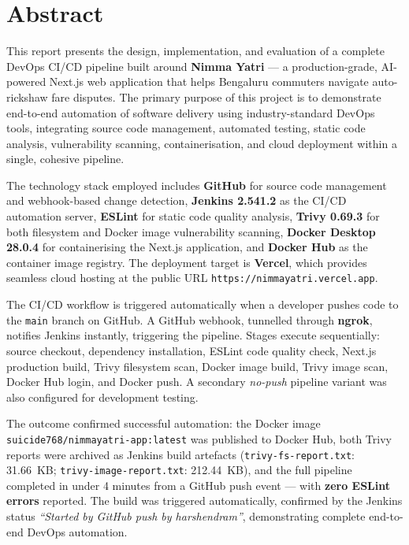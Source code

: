\documentclass[12pt,a4paper,oneside]{report}
\begin{document}
\clearpage
\setcounter{page}{1}

\pagestyle{plain}
\tableofcontents
\clearpage
\pagestyle{fancy}

\chapter{Abstract}

This report presents the design, implementation, and evaluation of a complete
DevOps CI/CD pipeline built around \textbf{Nimma Yatri} --- a production-grade,
AI-powered Next.js web application that helps Bengaluru commuters navigate
auto-rickshaw fare disputes. The primary purpose of this project is to demonstrate
end-to-end automation of software delivery using industry-standard DevOps tools,
integrating source code management, automated testing, static code analysis,
vulnerability scanning, containerisation, and cloud deployment within a single,
cohesive pipeline.

The technology stack employed includes \textbf{GitHub} for source code management
and webhook-based change detection, \textbf{Jenkins 2.541.2} as the CI/CD automation
server, \textbf{ESLint} for static code quality analysis,
\textbf{Trivy 0.69.3} for both filesystem and Docker image vulnerability scanning,
\textbf{Docker Desktop 28.0.4} for containerising the Next.js application, and
\textbf{Docker Hub} as the container image registry. The deployment target is
\textbf{Vercel}, which provides seamless cloud hosting at the public URL
\texttt{https://nimmayatri.vercel.app}.

The CI/CD workflow is triggered automatically when a developer pushes code to the
\texttt{main} branch on GitHub. A GitHub webhook, tunnelled through \textbf{ngrok},
notifies Jenkins instantly, triggering the pipeline. Stages execute sequentially:
source checkout, dependency installation, ESLint code quality check, Next.js
production build, Trivy filesystem scan, Docker image build, Trivy image scan,
Docker Hub login, and Docker push. A secondary \emph{no-push} pipeline variant was
also configured for development testing.

The outcome confirmed successful automation: the Docker image
\mbox{\texttt{suicide768/nimmayatri-app:latest}} was published to Docker Hub,
both Trivy reports were archived as Jenkins build artefacts
(\texttt{trivy-fs-report.txt}: 31.66~KB; \texttt{trivy-image-report.txt}: 212.44~KB),
and the full pipeline completed in under 4 minutes from a GitHub push event ---
with \textbf{zero ESLint errors} reported.
The build was triggered automatically, confirmed by the Jenkins status
\emph{``Started by GitHub push by harshendram''}, demonstrating complete end-to-end
DevOps automation.
\end{document}
